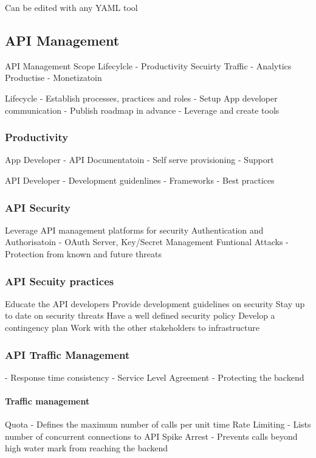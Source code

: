 \documentclass[a4paper, 11pt]{book}
\begin{document}
    Can be edited with any YAML tool

    \subsection{API Management}

    API Management Scope
    Lifecylcle - Productivity
    Secuirty
    Traffic - Analytics
    Productise - Monetizatoin


    Lifecycle
    - Establish processes, practices and roles
    - Setup App developer communication
    - Publish roadmap in advance
    - Leverage and create tools

    \subsubsection{Productivity}
    App Developer
    - API Documentatoin
    - Self serve provisioning
    - Support

    API Developer
    - Development guidenlines
    - Frameworks
    - Best practices

    \subsubsection{API Security}
    Leverage API management platforms for security
    Authentication and Authorisatoin - OAuth Server, Key/Secret Management
    Funtional Attacks - Protection from known and future threats

    \subsubsection{API Secuity practices}
    Educate the API developers
    Provide development guidelines on security
    Stay up to date on security threats
    Have a well defined security policy
    Develop a contingency plan
    Work with the other stakeholders to infrastructure

    \subsubsection{API Traffic Management}
    - Response time consistency
    - Service Level Agreement
    - Protecting the backend

    \paragraph{Traffic management}
    Quota - Defines the maximum number of calls per unit time
    Rate Limiting - Lists number of concurrent connections to API
    Spike Arrest - Prevents calls beyond high water mark from reaching the backend %
\end{document}
